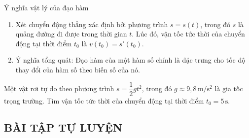 \begin{bt}
\begin{dang}{Ý nghĩa vật lý của đạo hàm}
	\begin{enumerate}[\iconCH]
		\item Xét chuyển động thẳng xác định bởi phương trình $s=s(t)$, trong đó $s$ là quảng đường đi được trong thời gian $t$. Lúc đó, vận tốc tức thời của chuyển động tại thời điểm $t_0$ là $v(t_0)=s'(t_0)$.
		\item Ý nghĩa tổng quát: Đạo hàm của một hàm số chính là đặc trưng cho tốc độ thay đổi của hàm số theo biến số của nó.
	\end{enumerate}
\end{dang}
\begin{vd}
	Một vật rơi tự do theo phương trình $s=\dfrac{1}{2}gt^2$, trong đó $g\approx 9,8\mathrm{\, m/s^2}$ là gia tốc trọng trường. Tìm vận tốc tức thời của chuyển động tại thời điểm $t_0=5\mathrm{\,s}$.
\end{vd}


\subsection{BÀI TẬP TỰ LUYỆN}


\end{bt}
